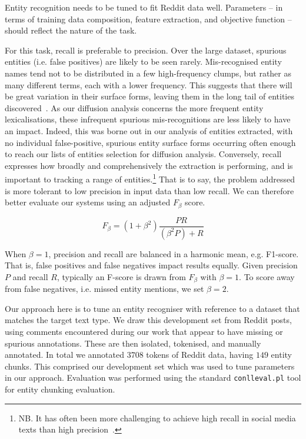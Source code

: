 \documentclass[sigconf]{acmart}
\begin{document}
Entity recognition needs to be tuned to fit Reddit data well.
Parameters -- in terms of training data composition, feature extraction, and objective function -- should reflect the nature of the task.

For this task, recall is preferable to precision.
Over the large dataset, spurious entities (i.e. false positives) are likely to be seen rarely.
Mis-recognised entity names tend not to be distributed in a few high-frequency clumps, but rather as many different terms, each with a lower frequency.
This suggests that there will be great variation in their surface forms, leaving them in the long tail of entities discovered~\cite{leginus2015enhanced}.
As our diffusion analysis concerns the more frequent entity lexicalisations, these infrequent spurious mis-recognitions are less likely to have an impact.
Indeed, this was borne out in our analysis of entities extracted, with no individual  false-positive, spurious entity surface forms occurring often enough to reach our lists of entities selection for diffusion analysis.
Conversely, recall expresses how broadly and comprehensively the extraction is performing, and is important to tracking a range of entities.\footnote{NB. It has often been more challenging to achieve high recall in social media texts than high precision~\cite{ritter2011named,derczynski2015analysis}.}
That is to say, the problem addressed is more tolerant to low precision in input data than low recall.
We can therefore better evaluate our systems using an adjusted $F_\beta$ score.

\begin{equation}
F_\beta = (1+\beta^2)\frac{PR}{(\beta^2 P) + R} 
\end{equation}

When $\beta=1$, precision and recall are balanced in a harmonic mean, e.g. F1-score.
That is, false positives and false negatives impact results equally.
Given precision $P$ and recall $R$, typically an F-score is drawn from $F_\beta$ with $\beta=1$.
To score away from false negatives, i.e. missed entity mentions, we set $\beta=2$.

Our approach here is to tune an entity recogniser with reference to a dataset that matches the target text type.
We draw this development set from Reddit posts, using comments encountered during our work that appear to have missing or spurious annotations.
These are then isolated, tokenised, and manually annotated.
In total we annotated $3 708$ tokens of Reddit data, having $149$ entity chunks.
This comprised our development set which was used to tune parameters in our approach.
Evaluation was performed using the standard {\tt \small conlleval.pl} tool for entity chunking evaluation.
\end{document}
